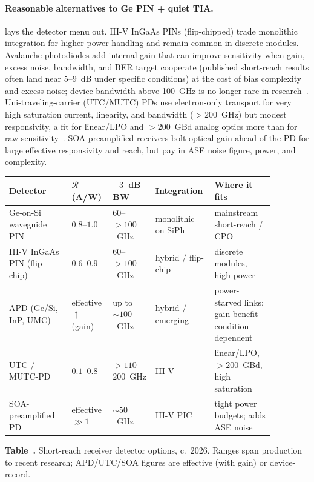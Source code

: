 \paragraph{Reasonable alternatives to Ge PIN + quiet TIA.}
 lays the detector menu out. III-V InGaAs PINs (flip-chipped)
trade monolithic integration for higher power handling and remain common in
discrete modules. Avalanche photodiodes add internal gain that can improve sensitivity when gain,
excess noise, bandwidth, and BER target cooperate (published short-reach results
often land near 5--9~dB under specific conditions) at the cost of bias complexity
and excess noise; device bandwidth above 100~GHz is no longer rare in
research~\cite{apd,gesiapd100,ofc360apd}.
Uni-traveling-carrier (UTC/MUTC) PDs use electron-only transport for very high
saturation current, linearity, and bandwidth ($>\!200$~GHz) but modest
responsivity, a fit for linear/LPO and $>\!200$~GBd analog optics more than for
raw sensitivity~\cite{utc}. SOA-preamplified receivers bolt optical gain ahead of
the PD for large effective responsivity and reach, but pay in ASE noise figure,
power, and complexity.

\begin{table}[ht]
\label{tab:rxtech}%
\centering
\setlength{\tabcolsep}{5pt}%
\footnotesize
\renewcommand{\arraystretch}{1.25}%
\begin{tabular}{@{}p{0.22\linewidth}p{0.13\linewidth}p{0.15\linewidth}p{0.16\linewidth}p{0.21\linewidth}@{}}
\toprule
Detector & $\mathcal{R}$ (A/W) & $-3$~dB BW & Integration & Where it fits \\
\midrule
Ge-on-Si waveguide PIN & $0.8$--$1.0$ & $60$--$>\!100$~GHz & monolithic on SiPh & mainstream short-reach / CPO \\
\addlinespace[1.5em]
III-V InGaAs PIN (flip-chip) & $0.6$--$0.9$ & $60$--$>\!100$~GHz & hybrid / flip-chip & discrete modules, high power \\
\addlinespace[1.5em]
APD (Ge/Si, InP, UMC) & effective $\uparrow$ (gain) & up to $\sim\!100$~GHz+ & hybrid / emerging & power-starved links; gain benefit condition-dependent \\
\addlinespace[1.5em]
UTC / MUTC-PD & $0.1$--$0.8$ & $>\!110$--$200$~GHz & III-V & linear/LPO, $>\!200$~GBd, high saturation \\
\addlinespace[1.5em]
SOA-preamplified PD & effective $\gg\!1$ & $\sim\!50$~GHz & III-V PIC & tight power budgets; adds ASE noise \\
\bottomrule
\end{tabular}
\par\medskip
{\raggedright\footnotesize\textbf{Table~\thetable.} Short-reach receiver detector
options, c.~2026. Ranges span production to recent research; APD/UTC/SOA figures
are effective (with gain) or device-record.\par}
\end{table}

